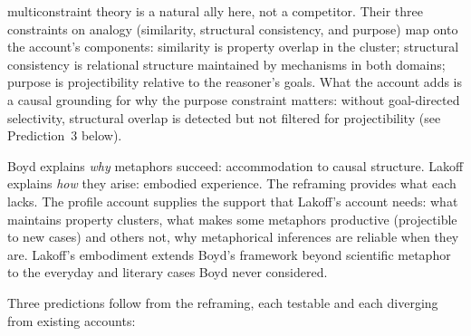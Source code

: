\documentclass[12pt]{article}
\begin{document}
 multiconstraint theory is a natural ally here, not a competitor. Their three constraints on analogy (similarity, structural consistency, and purpose) map onto the account's components: similarity is property overlap in the cluster; structural consistency is relational structure maintained by mechanisms in both domains; purpose is projectibility relative to the reasoner's goals. What the account adds is a causal grounding for why the purpose constraint matters: without goal-directed selectivity, structural overlap is detected but not filtered for projectibility (see Prediction~3 below).

Boyd explains \emph{why} metaphors succeed: accommodation to causal structure. Lakoff explains \emph{how} they arise: embodied experience. The reframing provides what each lacks. The profile account supplies the support that Lakoff's account needs: what maintains property clusters, what makes some metaphors productive (projectible to new cases) and others not, why metaphorical inferences are reliable when they are. Lakoff's embodiment extends Boyd's framework beyond scientific metaphor to the everyday and literary cases Boyd never considered.

Three predictions follow from the reframing, each testable and each diverging from existing accounts:
\end{document}

